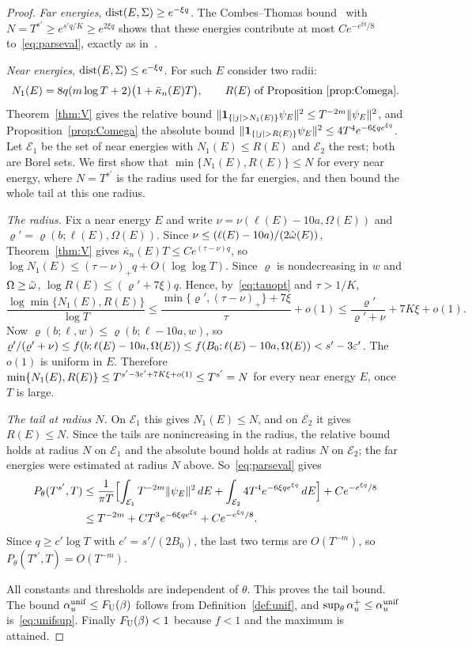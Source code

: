 \begin{proof}
\emph{Far energies}, $\operatorname{dist}(E,\Sigma)\ge e^{-\xi q}$. The Combes--Thomas bound~\cite[Theorem~5.15(3)]{DMuniv} with $N=T^{s'}\ge e^{s'q/K}\ge e^{2\xi q}$ shows that these energies contribute at most $Ce^{-e^{\xi q}/8}$ to~\eqref{eq:parseval}, exactly as in~\cite[proof of Theorem~5.15]{DMuniv}.

\emph{Near energies}, $\operatorname{dist}(E,\Sigma)\le e^{-\xi q}$. For such $E$ consider two radii:
\[
N_1(E)=8q(m\log T+2)\bigl(1+\bar\kappa_n(E)T\bigr),\qquad R(E)\text{ of Proposition~\ref{prop:Comega}}.
\]
Theorem~\ref{thm:V} gives the relative bound $\|\un_{\{|j|>N_1(E)\}}\psi_E\|^2\le T^{-2m}\|\psi_E\|^2$, and Proposition~\ref{prop:Comega} the absolute bound $\|\un_{\{|j|>R(E)\}}\psi_E\|^2\le4T^4e^{-6\xi qe^{\xi q}}$. Let $\mathcal E_1$ be the set of near energies with $N_1(E)\le R(E)$ and $\mathcal E_2$ the rest; both are Borel sets. We first show that $\min\{N_1(E),R(E)\}\le N$ for every near energy, where $N=T^{s'}$ is the radius used for the far energies, and then bound the whole tail at this one radius.

\emph{The radius.} Fix a near energy $E$ and write $\nu=\nu(\ell(E)-10a,\Omega(E))$ and $\varrho'=\varrho(b;\ell(E),\Omega(E))$. Since $\nu\le(\ell(E)-10a)/(2\hat\omega(E))$, Theorem~\ref{thm:V} gives $\bar\kappa_n(E)T\le Ce^{(\tau-\nu)q}$, so $\log N_1(E)\le(\tau-\nu)_+q+O(\log\log T)$. Since $\varrho$ is nondecreasing in $w$ and $\Omega\ge\tilde\omega$, $\log R(E)\le(\varrho'+7\xi)q$. Hence, by~\eqref{eq:tauopt} and $\tau>1/K$,
\[
\frac{\log\min\{N_1(E),R(E)\}}{\log T}\le\frac{\min\{\varrho',(\tau-\nu)_+\}+7\xi}{\tau}+o(1)\le\frac{\varrho'}{\varrho'+\nu}+7K\xi+o(1).
\]
Now $\varrho(b;\ell,w)\le\varrho(b;\ell-10a,w)$, so $\varrho'/(\varrho'+\nu)\le f(b;\ell(E)-10a,\Omega(E))\le f(B_0;\ell(E)-10a,\Omega(E))<s'-3\varepsilon'$. The $o(1)$ is uniform in $E$. Therefore $\min\{N_1(E),R(E)\}\le T^{s'-3\varepsilon'+7K\xi+o(1)}\le T^{s'}=N$ for every near energy $E$, once $T$ is large.

\emph{The tail at radius $N$.} On $\mathcal E_1$ this gives $N_1(E)\le N$, and on $\mathcal E_2$ it gives $R(E)\le N$. Since the tails are nonincreasing in the radius, the relative bound holds at radius $N$ on $\mathcal E_1$ and the absolute bound holds at radius $N$ on $\mathcal E_2$; the far energies were estimated at radius $N$ above. So~\eqref{eq:parseval} gives
\begin{align*}
P_\theta(T^{s'},T)&\le\frac1{\pi T}\Bigl[\int_{\mathcal E_1}T^{-2m}\|\psi_E\|^2\,dE+\int_{\mathcal E_2}4T^4e^{-6\xi qe^{\xi q}}\,dE\Bigr]+Ce^{-e^{\xi q}/8}\\
&\le T^{-2m}+CT^3e^{-6\xi qe^{\xi q}}+Ce^{-e^{\xi q}/8}.
\end{align*}
Since $q\ge c'\log T$ with $c'=s'/(2B_0)$, the last two terms are $O(T^{-m})$, so $P_\theta(T^{s'},T)=O(T^{-m})$.

All constants and thresholds are independent of $\theta$. This proves the tail bound. The bound $\alpha_u^{\mathrm{unif}}\le F_{\mathrm U}(\beta)$ follows from Definition~\ref{def:unif}, and $\sup_\theta\alpha_u^+\le\alpha_u^{\mathrm{unif}}$ is~\eqref{eq:unifsup}. Finally $F_{\mathrm U}(\beta)<1$ because $f<1$ and the maximum is attained.
\end{proof}


